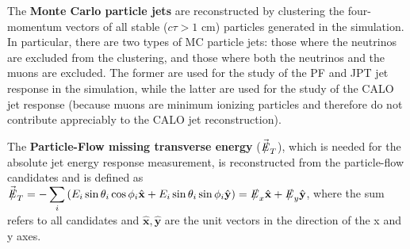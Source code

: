 The {\bf Monte Carlo particle jets} are reconstructed by clustering the four-momentum vectors of all stable ($c\tau > 1$ cm) particles generated in the simulation. In particular, there are two types of MC particle jets: those where the neutrinos are excluded from the clustering, and those where both the neutrinos and the muons are excluded. The former are used for the study of the PF and JPT jet response in the simulation, while the latter are used for the study of the CALO jet response (because muons are minimum ionizing particles and therefore do not contribute appreciably to the CALO jet reconstruction).

The {\bf Particle-Flow missing transverse energy} ($\vecmet$), which is needed for the absolute jet energy response measurement, is reconstructed from the particle-flow candidates and is defined as $\vecmet=-\displaystyle\sum_{i}{\left(E_i\sin\theta_i\cos\phi_i\hat{\mathbf{x}}+E_i\sin\theta_i\sin\phi_i\hat{\mathbf{y}}\right)}=\mex\hat{\mathbf{x}}+\mey\hat{\mathbf{y}}$, where the sum refers to all candidates and $\hat{\mathbf{x}},\hat{\mathbf{y}}$ are the unit vectors in the direction of the x and y axes.

